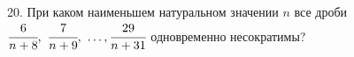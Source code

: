 20. При каком наименьшем натуральном значении $n$ все дроби $\cfrac{6}{n+8},\ \cfrac{7}{n+9},\ \ldots, \cfrac{29}{n+31}$ одновременно несократимы?\\
